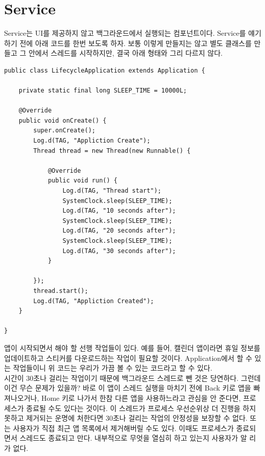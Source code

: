 \chapter{Service}
Service는 UI를 제공하지 않고 백그라운드에서 실행되는 컴포넌트이다.
Service를 얘기하기 전에 아래 코드를 한번 보도록 하자. 보통 이렇게 만들지는 않고 별도 클래스를 만들고 그 안에서 스레드를 시작하지만, 결국 아래 형태와 그리 다르지 않다.
\begin{lstlisting}[frame=single]
public class LifecycleApplication extends Application {
	
	private static final long SLEEP_TIME = 10000L;
	
	@Override
	public void onCreate() {
		super.onCreate();
		Log.d(TAG, "Appliction Create");
		Thread thread = new Thread(new Runnable() {

			@Override
			public void run() {
				Log.d(TAG, "Thread start");
				SystemClock.sleep(SLEEP_TIME);
				Log.d(TAG, "10 seconds after");
				SystemClock.sleep(SLEEP_TIME);
				Log.d(TAG, "20 seconds after");
				SystemClock.sleep(SLEEP_TIME);
				Log.d(TAG, "30 seconds after");
			}
			
		});
		thread.start();
		Log.d(TAG, "Appliction Created");
	}

}
\end{lstlisting}

앱이 시작되면서 해야 할 선행 작업들이 있다. 예를 들어, 캘린더 앱이라면 휴일 정보를 업데이트하고 스티커를 다운로드하는 작업이 필요할 것이다. 
Application에서 할 수 있는 작업들이니 위 코드는 우리가 가끔 볼 수 있는 코드라고 할 수 있다.\\

시간이 30초나 걸리는 작업이기 때문에 백그라운드 스레드로 뺀 것은 당연하다. 그런데 이건 무슨 문제가 있을까? 
바로 이 앱이 스레드 실행을 마치기 전에 Back 키로 앱을 빠져나오거나, Home 키로 나가서 한참 다른 앱을 사용하느라고 관심을 안 준다면, 프로세스가 종료될 수도 있다는 것이다. 
이 스레드가 프로세스 우선순위상 더 진행을 하지 못하고 제거되는 운명에 처한다면 30초나 걸리는 작업의 안정성을 보장할 수 없다.
또는 사용자가 직접 최근 앱 목록에서 제거해버릴 수도 있다. 이때도 프로세스가 종료되면서 스레드도 종료되고 만다. 내부적으로 무엇을 열심히 하고 있는지 사용자가 알 리가 없다.\\

